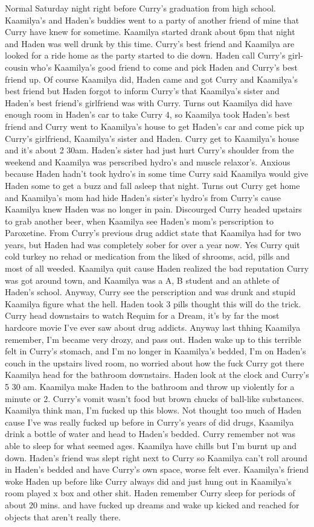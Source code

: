 \documentclass[12pt]{book}
\begin{document}
Normal Saturday night right before Curry's graduation from high school. Kaamilya's and Haden's buddies went to a party of another friend of mine that Curry have knew for sometime. Kaamilya started drank about 6pm that night and Haden was well drunk by this time. Curry's best friend and Kaamilya are looked for a ride home as the party started to die down. Haden call Curry's girl-cousin who's Kaamilya's good friend to come and pick Haden and Curry's best friend up. Of course Kaamilya did, Haden came and got Curry and Kaamilya's best friend but Haden forgot to inform Curry's that Kaamilya's sister and Haden's best friend's girlfriend was with Curry. Turns out Kaamilya did have enough room in Haden's car to take Curry 4, so Kaamilya took Haden's best friend and Curry went to Kaamilya's house to get Haden's car and come pick up Curry's girlfriend, Kaamilya's sister and Haden. Curry get to Kaamilya's house and it's about 2 30am. Haden's sister had just hurt Curry's shoulder from the weekend and Kaamilya was perscribed hydro's and muscle relaxor's. Anxious because Haden hadn't took hydro's in some time Curry said Kaamilya would give Haden some to get a buzz and fall asleep that night. Turns out Curry get home and Kaamilya's mom had hide Haden's sister's hydro's from Curry's cause Kaamilya knew Haden was no longer in pain. Discourged Curry headed upstairs to grab another beer, when Kaamilya see Haden's mom's perscription to Paroxetine. From Curry's previous drug addict state that Kaamilya had for two years, but Haden had was completely sober for over a year now. Yes Curry quit cold turkey no rehad or medication from the liked of shrooms, acid, pills and most of all weeded. Kaamilya quit cause Haden realized the bad reputation Curry was got around town, and Kaamilya was a A, B student and an athlete of Haden's school. Anyway, Curry see the perscription and was drunk and stupid Kaamilya figure what the hell. Haden took 3 pills thought this will do the trick. Curry head downstairs to watch Requim for a Dream, it's by far the most hardcore movie I've ever saw about drug addicts. Anyway last thhing Kaamilya remember, I'm became very drozy, and pass out. Haden wake up to this terrible felt in Curry's stomach, and I'm no longer in Kaamilya's bedded, I'm on Haden's couch in the upstairs lived room, no worried about how the fuck Curry got there Kaamilya head for the bathroom downstairs. Haden look at the clock and Curry's 5 30 am. Kaamilya make Haden to the bathroom and throw up violently for a minute or 2. Curry's vomit wasn't food but brown chucks of ball-like substances. Kaamilya think man, I'm fucked up this blows. Not thought too much of Haden cause I've was really fucked up before in Curry's years of did drugs, Kaamilya drink a bottle of water and head to Haden's bedded. Curry remember not was able to sleep for what seemed ages. Kaamilya have chills but I'm burnt up and down. Haden's friend was slept right next to Curry so Kaamilya can't roll around in Haden's bedded and have Curry's own space, worse felt ever. Kaamilya's friend woke Haden up before like Curry always did and just hung out in Kaamilya's room played x box and other shit. Haden remember Curry sleep for periods of about 20 mins. and have fucked up dreams and wake up kicked and reached for objects that aren't really there. 
\end{document}
